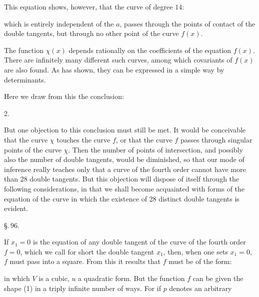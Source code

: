 This equation shows, however, that the curve of degree $14$:


which is entirely independent of the $a$, passes through the points of contact of the double tangents, but through no other point of the curve $f(x)$.

The function $\chi(x)$ depends rationally on the coefficients of the equation $f(x)$. There are infinitely many different such curves, among which covariants of $f(x)$ are also found. As  has shown, they can be expressed in a simple way by determinants.

Here we draw from this the conclusion:

2.\ 

But one objection to this conclusion must still be met. It would be conceivable that the curve $\chi$ touches the curve $f$, or that the curve $f$ passes through singular points of the curve $\chi$. Then the number of points of intersection, and possibly also the number of double tangents, would be diminished, so that our mode of inference really teaches only that a curve of the fourth order cannot have more than 28 double tangents. But this objection will dispose of itself through the following considerations, in that we shall become acquainted with forms of the equation of the curve in which the existence of 28 distinct double tangents is evident.

\begin{center}
\S.\,96.

\end{center}

If $x_1 = 0$ is the equation of any double tangent of the curve of the fourth order $f = 0$, which we call for short the double tangent $x_1$, then, when one sets $x_1 = 0$, $f$ must pass into a square. From this it results that $f$ must be of the form:


in which $V$ is a cubic, $u$ a quadratic form. But the function $f$ can be given the shape (1) in a triply infinite number of ways. For if $p$ denotes an arbitrary

